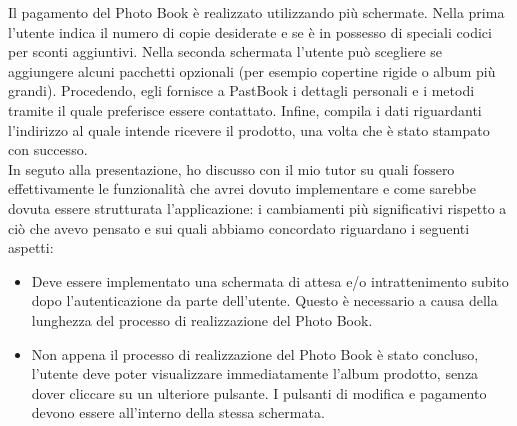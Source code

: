 				\noindent Il pagamento del Photo Book è realizzato utilizzando più schermate. Nella prima l'utente indica il numero
				di copie desiderate e se è in possesso di speciali codici per sconti aggiuntivi. Nella seconda schermata l'utente può
				scegliere se aggiungere alcuni pacchetti opzionali (per esempio copertine rigide o album più grandi). Procedendo, egli
				fornisce a PastBook i dettagli personali e i metodi tramite il quale preferisce essere contattato. Infine, compila
				i dati riguardanti l'indirizzo al quale intende ricevere il prodotto, una volta che è stato stampato con successo.\\
				In seguto alla presentazione, ho discusso con il mio tutor su quali fossero effettivamente le funzionalità che avrei
				dovuto implementare e come sarebbe dovuta essere strutturata l'applicazione: i cambiamenti più significativi
				rispetto a ciò che avevo pensato e sui quali abbiamo concordato riguardano i seguenti aspetti:
				\begin{itemize}
					\item Deve essere implementato una schermata di attesa e/o intrattenimento subito dopo l'autenticazione da
					parte dell'utente. Questo è necessario a causa della lunghezza del processo di realizzazione del Photo Book.
					\item Non appena il processo di realizzazione del Photo Book è stato concluso, l'utente deve poter
					visualizzare immediatamente l'album prodotto, senza dover cliccare su un ulteriore pulsante. I pulsanti di
					modifica e pagamento devono essere all'interno della stessa schermata.
				\end{itemize}
